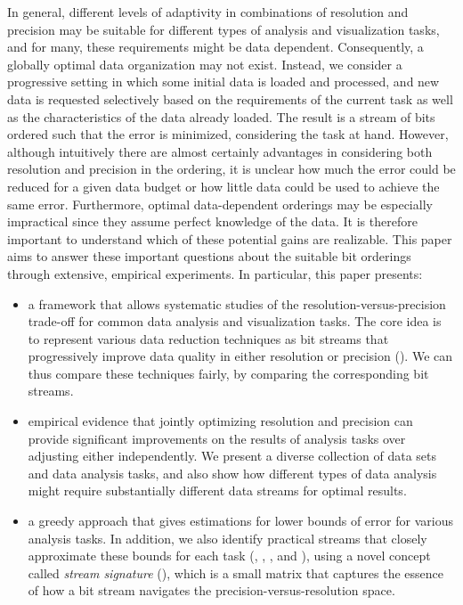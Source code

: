 In general, different levels of adaptivity in combinations of resolution and precision may be
suitable for different types of analysis and visualization tasks, and for many, these requirements
might be data dependent. Consequently, a globally optimal data organization may not exist. Instead,
we consider a progressive setting in which some initial data is loaded and processed, and new data
is requested selectively based on the requirements of the current task as well as the characteristics
of the data already loaded. The result is a stream of bits ordered such that the error is minimized,
considering the task at hand. However, although intuitively there are almost certainly advantages in
considering both resolution and precision in the ordering, it is unclear how much the error could be
reduced for a given data budget or how little data could be used to achieve the same error.
Furthermore, optimal data-dependent orderings may be especially impractical since they assume
perfect knowledge of the data. It is therefore important to understand which of these potential
gains are realizable. This paper aims to answer these important questions about the suitable bit
orderings through extensive, empirical experiments. In particular, this paper presents:

\begin{itemize}\dense
%
\item a framework that allows systematic studies of the resolution-versus-precision trade-off for
common data analysis and visualization tasks. The core idea is to represent various data reduction
techniques as bit streams that progressively improve data quality in either resolution or precision
(). We can thus compare these techniques fairly, by comparing the
corresponding bit streams.
%  
\item empirical evidence that jointly optimizing resolution and precision can provide significant
improvements on the results of analysis tasks over adjusting either independently. 
We present a diverse collection of data sets and data analysis tasks, and also show how
different types of data analysis might require substantially different data streams for optimal
results.
%
\item a greedy approach that gives estimations for lower bounds of error for various analysis tasks.
In addition, we also identify practical streams that closely approximate these bounds for each task
(, , , and
), using a novel concept called \emph{stream signature}
(), which is a small matrix that captures the essence of how a bit stream
navigates the precision-versus-resolution space.
\end{itemize}

